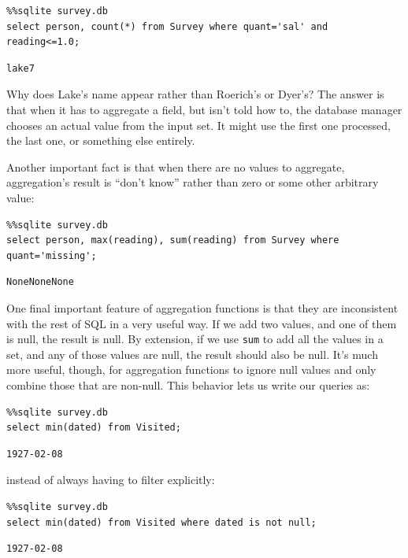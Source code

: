 \documentclass{book}
\begin{document}
\begin{verbatim}
%%sqlite survey.db
select person, count(*) from Survey where quant='sal' and reading<=1.0;
\end{verbatim}

\begin{verbatim}
lake7
\end{verbatim}

Why does Lake's name appear rather than Roerich's or Dyer's? The answer
is that when it has to aggregate a field, but isn't told how to, the
database manager chooses an actual value from the input set. It might
use the first one processed, the last one, or something else entirely.

Another important fact is that when there are no values to aggregate,
aggregation's result is ``don't know'' rather than zero or some other
arbitrary value:

\begin{verbatim}
%%sqlite survey.db
select person, max(reading), sum(reading) from Survey where quant='missing';
\end{verbatim}

\begin{verbatim}
NoneNoneNone
\end{verbatim}

One final important feature of aggregation functions is that they are
inconsistent with the rest of SQL in a very useful way. If we add two
values, and one of them is null, the result is null. By extension, if we
use \texttt{sum} to add all the values in a set, and any of those values
are null, the result should also be null. It's much more useful, though,
for aggregation functions to ignore null values and only combine those
that are non-null. This behavior lets us write our queries as:

\begin{verbatim}
%%sqlite survey.db
select min(dated) from Visited;
\end{verbatim}

\begin{verbatim}
1927-02-08
\end{verbatim}

instead of always having to filter explicitly:

\begin{verbatim}
%%sqlite survey.db
select min(dated) from Visited where dated is not null;
\end{verbatim}

\begin{verbatim}
1927-02-08
\end{verbatim}
\end{document}
